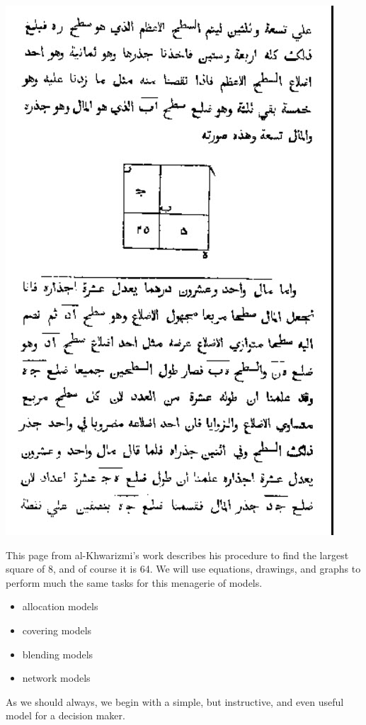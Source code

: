 \documentclass[
]{book}
\begin{document}
\includegraphics{images/03/pie-2-products-arabic-algebra.jpg}

This page from al-Khwarizmi's work describes his procedure to find the largest square of 8, and of course it is 64. We will use equations, drawings, and graphs to perform much the same tasks for this menagerie of models.

\begin{itemize}
\item
  allocation models
\item
  covering models
\item
  blending models
\item
  network models
\end{itemize}

As we should always, we begin with a simple, but instructive, and even useful model for a decision maker.
\end{document}
